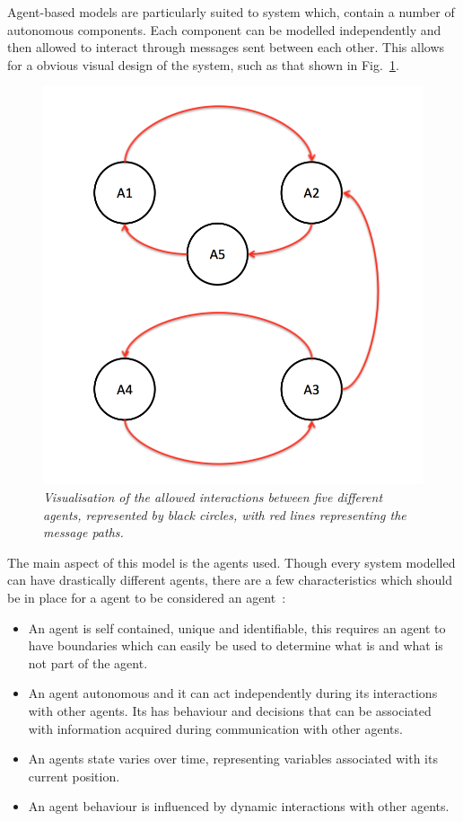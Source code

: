 \documentclass{article}
\begin{document}
Agent-based models are particularly suited to system which, contain a number of autonomous components. Each component can be modelled independently and then allowed to interact through messages sent between each other. This allows for a obvious visual design of the system, such as that shown in Fig.~\ref{fig:abmii}.
\begin{figure}[H]
	\centering
	\includegraphics[scale=0.5]{abmii}
	\caption{\it Visualisation of the allowed interactions between five different agents, represented by black circles, with red lines representing the message paths.}
	\label{fig:abmii}
\end{figure} 
The main aspect of this model is the agents used. Though every system modelled can have drastically different agents, there are a few characteristics which should be in place for a agent to be considered an agent~\cite{MN2010, abmtsd}:
\begin{itemize}
   \item An agent is self contained, unique and identifiable, this requires an agent to have boundaries which can easily be used to determine what is and what is not part of the agent. 
   \item An agent autonomous and it can act independently during its interactions with other agents. Its has behaviour and decisions that can be associated with information acquired  during communication with other agents. 
   \item An agents state varies over time, representing variables associated with its current position. 
   \item An agent behaviour is influenced by dynamic interactions with other agents. 
\end{itemize}
\end{document}
